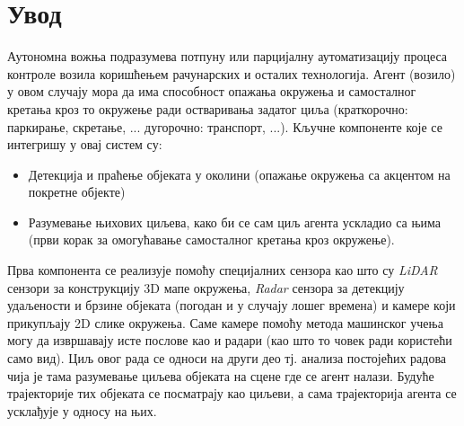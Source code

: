 \documentclass[11pt,oneside]{memoir}
\begin{document}
\frontmatter
\naslovna
\komisija
\apstrakt
\tableofcontents*

\mainmatter

\chapter{Увод}

Аутономна вожња подразумева потпуну или парцијалну аутоматизацију процеса контроле возила коришћењем рачунарских и осталих технологија. Агент (возило) 
у овом случају мора да има способност опажања окружења и самосталног кретања кроз то окружење ради остваривања задатог циља 
(краткорочно: паркирање, скретање, ... дугорочно: транспорт, ...). Кључне
компоненте које се интегришу у овај систем су:
\begin{itemize} 
  \item Детекција и праћење објеката у околини (опажање окружења са акцентом на покретне објекте) 
  \item Разумевање њихових циљева, како би се сам циљ агента ускладио са њима (први корак за омогућавање самосталног кретања кроз окружење).
\end{itemize} 
Прва компонента се реализује помоћу специјалних сензора као што су \textit{LiDAR} сензори за конструкцију 3D мапе окружења, \textit{Radar} сензора
за детекцију удаљености и брзине објеката (погодан и у случају лошег времена) и камере који прикупљају 2D слике окружења. Саме камере помоћу
метода машинског учења могу да извршавају исте послове као и радари (као што то човек ради користећи само вид). Циљ овог рада се односи на други део
тј. анализа постојећих радова чија је тама разумевање циљева објеката на сцене где се агент налази. Будуће трајекторије тих објеката се посматрају
као циљеви, а сама трајекторија агента се усклађује у односу на њих.
\end{document}
